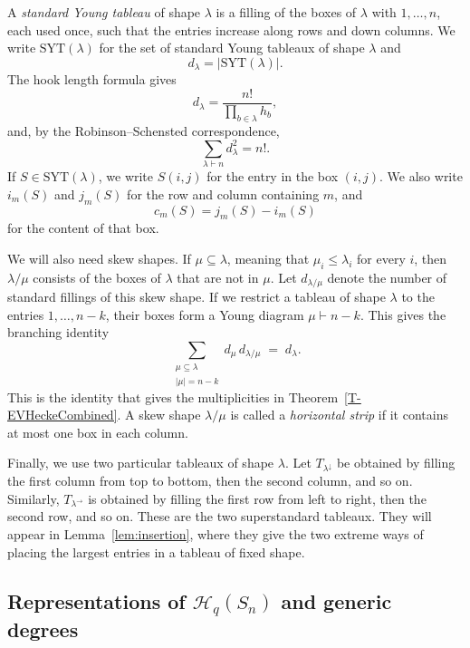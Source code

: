 \documentclass[11pt]{article}
\theoremstyle{plain}  %
\begin{document}
A \emph{standard Young tableau} of shape $\lambda$ is a filling of the boxes of
$\lambda$ with $1,\ldots,n$, each used once, such that the entries increase
along rows and down columns. We write $\mathrm{SYT}(\lambda)$ for the set of
standard Young tableaux of shape $\lambda$ and
\[
    d_\lambda=|\mathrm{SYT}(\lambda)|.
\]
The hook length formula gives
\[
    d_\lambda=\frac{n!}{\prod_{b\in\lambda}h_b},
\]
and, by the Robinson--Schensted correspondence,
\[
    \sum_{\lambda\vdash n}d_\lambda^2=n!.
\]
If $S\in\mathrm{SYT}(\lambda)$, we write $S(i,j)$ for the entry in the box
$(i,j)$. We also write $i_m(S)$ and $j_m(S)$ for the row and column containing
$m$, and
\[
    c_m(S)=j_m(S)-i_m(S)
\]
for the content of that box.

We will also need skew shapes. If $\mu\subseteq\lambda$, meaning that
$\mu_i\leq\lambda_i$ for every $i$, then $\lambda/\mu$ consists of the boxes
of $\lambda$ that are not in $\mu$. Let $d_{\lambda/\mu}$ denote the number of
standard fillings of this skew shape. If we restrict a tableau of shape
$\lambda$ to the entries $1,\ldots,n-k$, their boxes form a Young diagram
$\mu\vdash n-k$. This gives the branching identity
\begin{equation}\label{eq:branching}
  \sum_{\substack{\mu \subseteq \lambda \\ |\mu| = n-k}}
  d_\mu\, d_{\lambda/\mu} \;=\; d_\lambda .
\end{equation}
This is the identity that gives the multiplicities in
Theorem~\ref{T-EVHeckeCombined}. A skew shape $\lambda/\mu$ is called a
\emph{horizontal strip} if it contains at most one box in each column.

Finally, we use two particular tableaux of shape $\lambda$. Let
$T_{\lambda^{\downarrow}}$ be obtained by filling the first column from top to
bottom, then the second column, and so on. Similarly,
$T_{\lambda^{\to}}$ is obtained by filling the first row from left to right,
then the second row, and so on. These are the two superstandard tableaux. They
will appear in Lemma~\ref{lem:insertion}, where they give the two extreme ways
of placing the largest entries in a tableau of fixed shape.




\subsection{Representations of \texorpdfstring{$\mathcal{H}_q(S_n)$}{H\_q(S\_n)} and generic degrees}
\label{sec:reps}
\end{document}
